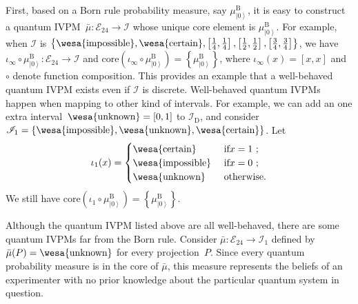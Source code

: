 \documentclass[reprint, aps, prl,superscriptaddress, showpacs,
showkeys]{revtex4-1}
\theoremstyle{plain}
\theoremstyle{definition}
\newcommand{\events}{\ensuremath{\mathcal{E}}}
\newcommand{\imposs}{{\mbox{\wesa{impossible}}}}
\newcommand{\necess}{{\mbox{\wesa{certain}}}}
\newcommand{\unknown}{{\mbox{\wesa{unknown}}}}
\newcommand{\ket}[1]{{\left\vert{#1}\right\rangle}}
\begin{document}
First, based on a Born rule probability measure, say $\mu_{\ket{0}}^{\mathrm{\mathrm{B}}}$,
it is easy to construct a quantum IVPM~$\bar{\mu}:\events_{24}\rightarrow\mathscr{I}$
whose unique core element is $\mu_{\ket{0}}^{\mathrm{\mathrm{B}}}$.
For example, when $\mathscr{I}$ is $\left\{ \imposs,\necess,\left[\frac{1}{4},\frac{1}{4}\right],\left[\frac{1}{2},\frac{1}{2}\right],\left[\frac{3}{4},\frac{3}{4}\right]\right\} $,
we have $\iota_{\infty}\circ\mu_{\ket{0}}^{\mathrm{\mathrm{B}}}:\events_{24}\rightarrow\mathscr{I}$
and $\mathrm{core}\left(\iota_{\infty}\circ\mu_{\ket{0}}^{\mathrm{\mathrm{B}}}\right)=\left\{ \mu_{\ket{0}}^{\mathrm{\mathrm{B}}}\right\} $,
where $\iota_{\infty}\left(x\right)=\left[x,x\right]$ and $\circ$
denote function composition. This provides an example that a well-behaved
quantum IVPM exists even if $\mathscr{I}$ is discrete. Well-behaved
quantum IVPMs happen when mapping to other kind of intervals. For
example, we can add an one extra interval~$\unknown=\left[0,1\right]$
to $\mathscr{I}_{\mathrm{D}}$, and consider $\mathscr{I}_{1}=\left\{ \imposs,\unknown,\necess\right\} $.
Let 
\begin{equation} 
\iota_1(x)=\begin{cases} 
\necess & \text{ if}x=1\text{ ;}\\ 
\imposs & \text{ if}x=0\text{ ;}\\ 
\unknown & \text{ otherwise.}
\end{cases}\label{eq:homomorphism-1} \end{equation}
We still have $\mathrm{core}\left(\iota_{1}\circ\mu_{\ket{0}}^{\mathrm{\mathrm{B}}}\right)=\left\{ \mu_{\ket{0}}^{\mathrm{\mathrm{B}}}\right\} $.

Although the quantum IVPM listed above are all well-behaved, there
are some quantum IVPMs far from the Born rule. Consider $\bar{\mu}:\events_{24}\rightarrow\mathscr{I}_{1}$
defined by $\bar{\mu}(P)=\unknown$ for every projection~$P$. Since
every quantum probability measure is in the core of $\bar{\mu}$,
this measure represents the beliefs of an experimenter with no prior
knowledge about the particular quantum system in question. 
\end{document}
